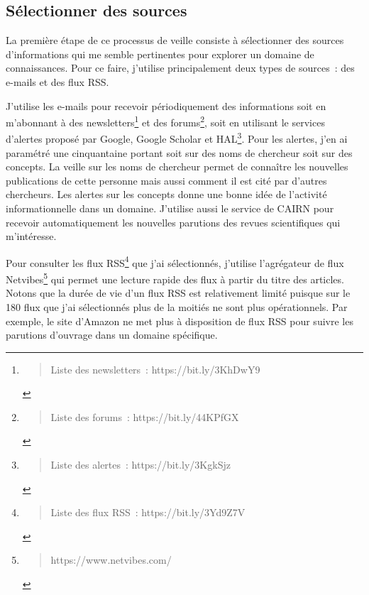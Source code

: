 \documentclass[
  a4paper,
  DIV=11,
  numbers=noendperiod]{scrreprt}
\begin{document}
\subsection{Sélectionner des sources}\label{sec-selectSources}

La première étape de ce processus de veille consiste à sélectionner des
sources d'informations qui me semble pertinentes pour explorer un
domaine de connaissances. Pour ce faire, j'utilise principalement deux
types de sources~: des e-mails et des flux RSS.

J'utilise les e-mails pour recevoir périodiquement des informations soit
en m'abonnant à des newsletters\footnote{\begin{quote}
  Liste des newsletters~: https://bit.ly/3KhDwY9
  \end{quote}} et des forums\footnote{\begin{quote}
  Liste des forums~: https://bit.ly/44KPfGX
  \end{quote}}, soit en utilisant le services d'alertes proposé par
Google, Google Scholar et HAL\footnote{\begin{quote}
  Liste des alertes~: https://bit.ly/3KgkSjz
  \end{quote}}. Pour les alertes, j'en ai paramétré une cinquantaine
portant soit sur des noms de chercheur soit sur des concepts. La veille
sur les noms de chercheur permet de connaître les nouvelles publications
de cette personne mais aussi comment il est cité par d'autres
chercheurs. Les alertes sur les concepts donne une bonne idée de
l'activité informationnelle dans un domaine. J'utilise aussi le service
de CAIRN pour recevoir automatiquement les nouvelles parutions des
revues scientifiques qui m'intéresse.

Pour consulter les flux RSS\footnote{\begin{quote}
  Liste des flux RSS~: https://bit.ly/3Yd9Z7V
  \end{quote}} que j'ai sélectionnés, j'utilise l'agrégateur de flux
Netvibes\footnote{\begin{quote}
  https://www.netvibes.com/
  \end{quote}} qui permet une lecture rapide des flux à partir du titre
des articles. Notons que la durée de vie d'un flux RSS est relativement
limité puisque sur le 180 flux que j'ai sélectionnés plus de la moitiés
ne sont plus opérationnels. Par exemple, le site d'Amazon ne met plus à
disposition de flux RSS pour suivre les parutions d'ouvrage dans un
domaine spécifique.
\end{document}
